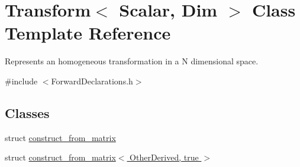 \hypertarget{class_transform}{\section{Transform$<$ Scalar, Dim $>$ Class Template Reference}
\label{class_transform}
}


Represents an homogeneous transformation in a N dimensional space.  




{\ttfamily \#include $<$Forward\-Declarations.\-h$>$}

\subsection*{Classes}
\begin{DoxyCompactItemize}
\item 
struct \hyperlink{struct_transform_1_1construct__from__matrix}{construct\-\_\-from\-\_\-matrix}
\item 
struct \hyperlink{struct_transform_1_1construct__from__matrix_3_01_other_derived_00_01true_01_4}{construct\-\_\-from\-\_\-matrix$<$ Other\-Derived, true $>$}
\end{DoxyCompactItemize}
